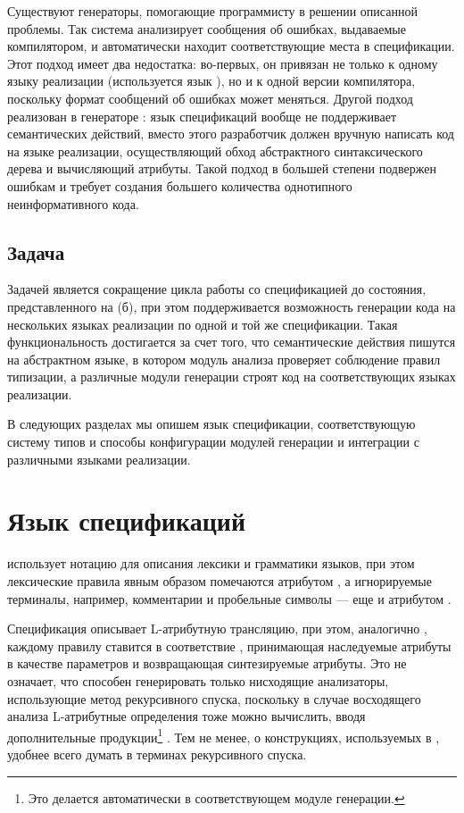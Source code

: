 Существуют генераторы, помогающие программисту в решении описанной проблемы. Так система  \cite{???} анализирует сообщения об ошибках, выдаваемые компилятором, и автоматически находит соответствующие места в спецификации. Этот подход имеет два недостатка: во-первых, он привязан не только к одному языку реализации (используется язык ), но и к одной версии компилятора, поскольку формат сообщений об ошибках может меняться. Другой подход реализован в генераторе  \cite{???}: язык спецификаций вообще не поддерживает семантических действий, вместо этого разработчик должен вручную написать код на языке реализации, осуществляющий обход абстрактного синтаксического дерева и вычисляющий атрибуты. Такой подход в большей степени подвержен ошибкам и требует создания большего количества однотипного неинформативного кода.

\section{Задача \ATF{}}

Задачей \ATF{} является сокращение цикла работы со спецификацией до состояния, представленного на  (б), при этом поддерживается возможность генерации кода на нескольких языках реализации по одной и той же спецификации.
Такая функциональность достигается за счет того, что семантические действия пишутся на абстрактном языке, в котором модуль анализа проверяет соблюдение правил типизации, а различные модули генерации строят код на соответствующих языках реализации.

В следующих разделах мы опишем язык спецификации, соответствующую систему типов и способы конфигурации модулей генерации и интеграции с различными языками реализации.

\chapter{Язык спецификаций \ATF{}}

\ATF{} использует нотацию \GRM{} для описания лексики и грамматики языков, при этом лексические правила явным образом помечаются атрибутом , а игнорируемые терминалы, например, комментарии и пробельные символы --- еще и атрибутом .

Спецификация описывает L-атрибутную трансляцию, при этом, аналогично , каждому правилу ставится в соответствие , принимающая наследуемые атрибуты в качестве параметров и возвращающая синтезируемые атрибуты. Это не означает, что \ATF{} способен генерировать только нисходящие анализаторы, использующие метод рекурсивного спуска, поскольку в случае восходящего анализа L-атрибутные определения тоже можно вычислить, вводя дополнительные продукции\footnote{Это делается автоматически в соответствующем модуле генерации.} \cite{???}. Тем не менее, о конструкциях, используемых в \ATF{}, удобнее всего думать в терминах рекурсивного спуска.

